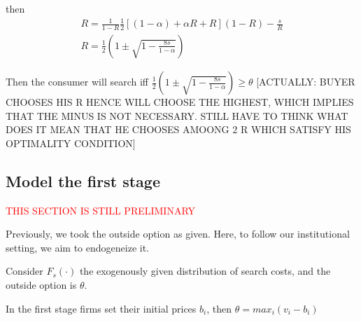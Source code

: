 \documentclass[12pt]{article}
\theoremstyle{plain}
\theoremstyle{plain}
\begin{document}
then 
\begin{align*}
        R = \frac{1}{1-R} \frac{1}{2} [ (1-\alpha) + \alpha R +R](1-  R) -\frac{s}{R} \\
        R = \frac{1}{2} \left( 1 \pm \sqrt{1 - \frac{8s}{1 - \alpha}} \right)
\end{align*}

Then the consumer will search iff $\frac{1}{2} \left( 1 \pm \sqrt{1 - \frac{8s}{1 - \alpha}} \right) \geq \theta$ [ACTUALLY: BUYER CHOOSES HIS R HENCE WILL CHOOSE THE HIGHEST, WHICH IMPLIES THAT THE MINUS IS NOT NECESSARY. STILL HAVE TO THINK WHAT DOES IT MEAN THAT HE CHOOSES AMOONG 2 R WHICH SATISFY HIS OPTIMALITY CONDITION]

\subsection{Model the first stage}

\textcolor{red}{THIS SECTION IS STILL PRELIMINARY}

Previously, we took the outside option as given. Here, to follow our institutional setting, we aim to endogeneize it. 

Consider  \( F_s(\cdot) \) the exogenously given distribution of search costs, and the outside option is \( \theta \).  

In the first stage firms set their initial prices $b_i$, then $\theta = max_i(v_i - b_i)$

\end{document}
